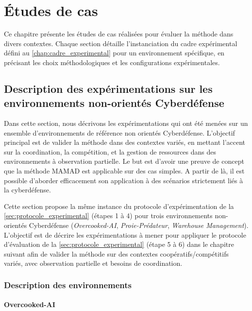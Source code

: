 \chapter{Études de cas}
\label{chap:case_studies}

Ce chapitre présente les études de cas réalisées pour évaluer la méthode  dans divers contextes. Chaque section détaille l'instanciation du cadre expérimental défini au \autoref{chap:cadre_experimental} pour un environnement spécifique, en précisant les choix méthodologiques et les configurations expérimentales.

\section{Description des expérimentations sur les environnements non-orientés Cyberdéfense}

Dans cette section, nous décrivons les expérimentations qui ont été menées sur un ensemble d'environnements de référence non orientés Cyberdéfense. L'objectif principal est de valider la méthode  dans des contextes variés, en mettant l'accent sur la coordination, la compétition, et la gestion de ressources dans des environnements à observation partielle. Le but est d'avoir une preuve de concept que la méthode MAMAD est applicable sur des cas simples. A partir de là, il est possible d'aborder efficacement son application à des scénarios strictement liés à la cyberdéfense.

Cette section propose la même instance du protocole d'expérimentation de la \autoref{sec:protocole_experimental} (étapes 1 à 4) pour trois environnements non-orientés Cyberdéfense (\textit{Overcooked-AI}, \textit{Proie-Prédateur}, \textit{Warehouse Management}).
L’objectif est de décrire les expérimentations à mener pour appliquer le protocole d'évaluation de la \autoref{sec:protocole_experimental} (étape 5 à 6) dans le chapitre suivant afin de valider la méthode  sur des contextes coopératifs/compétitifs variés, avec observation partielle et besoins de coordination.


\subsection{Description des environnements}

\subsubsection*{Overcooked-AI}

